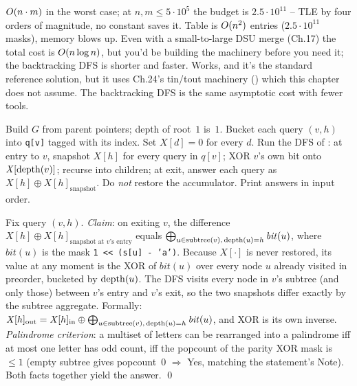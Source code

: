 \begin{thinkbox}
{$O(n\cdot m)$ in the worst case; at $n, m\le 5\cdot 10^{5}$ the
budget is $2.5\cdot 10^{11}$ -- TLE by four orders of magnitude, no
constant saves it.}
{Table is $O(n^2)$ entries ($2.5\cdot 10^{11}$ masks), memory blows
up. Even with a small-to-large DSU merge (Ch.17) the total cost is
$O(n\log n)$, but you'd be building the machinery before you need
it; the backtracking DFS is shorter and faster.}
{Works, and it's the standard reference solution, but it uses Ch.24's
tin/tout machinery () which this chapter does not assume.
The backtracking DFS is the same asymptotic cost with fewer tools.}
\end{thinkbox}

Build $G$ from parent pointers; depth of root~$1$ is~$1$. Bucket each
query $(v,h)$ into \lstinline{q[v]} tagged with its index. Set
$\mathit{X}[d]=0$ for every $d$. Run the DFS of :
at entry to $v$, snapshot $\mathit{X}[h]$ for every query in
$\mathit{q}[v]$; XOR $v$'s own bit onto $\mathit{X}[\operatorname{depth}(v)]$;
recurse into children; at exit, answer each query as
$\mathit{X}[h]\oplus\mathit{X}[h]_{\text{snapshot}}$. Do \emph{not}
restore the accumulator. Print answers in input order.

\begin{proofbox}
Fix query $(v, h)$. \emph{Claim}: on exiting $v$, the difference
$\mathit{X}[h]\oplus\mathit{X}[h]_{\text{snapshot at $v$'s entry}}$
equals $\bigoplus_{u \in \mathrm{subtree}(v),\,\operatorname{depth}(u)=h} \mathit{bit}(u)$,
where $\mathit{bit}(u)$ is the mask \texttt{1 << (s[u] - 'a')}.
Because $\mathit{X}[\cdot]$ is never restored, its value at any
moment is the XOR of $\mathit{bit}(u)$ over every node $u$ already
visited in preorder, bucketed by $\operatorname{depth}(u)$. The DFS visits every
node in $v$'s subtree (and only those) between $v$'s entry and $v$'s
exit, so the two snapshots differ exactly by the subtree aggregate.
Formally: $\mathit{X}[h]_{\mathrm{out}} = \mathit{X}[h]_{\mathrm{in}}
\oplus \bigoplus_{u\in\mathrm{subtree}(v),\,\operatorname{depth}(u)=h}\mathit{bit}(u)$,
and XOR is its own inverse. \emph{Palindrome criterion}: a multiset of
letters can be rearranged into a palindrome iff at most one letter has
odd count, iff the popcount of the parity XOR mask is $\le 1$ (empty
subtree gives popcount~$0$ $\Rightarrow$ Yes, matching the statement's
Note). Both facts together yield the answer. \qed
\end{proofbox}

